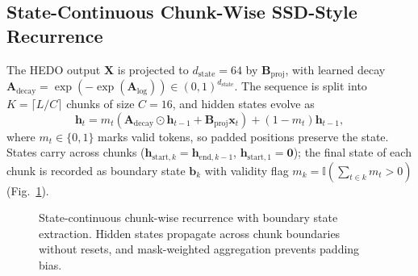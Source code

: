 \documentclass[pdflatex,sn-mathphys-num]{sn-jnl}
\begin{document}
\subsection{State-Continuous Chunk-Wise SSD-Style Recurrence}
The HEDO output $\mathbf{X}$ is projected to $d_{\text{state}} = 64$ by $\mathbf{B}_{\text{proj}}$, with learned decay $\mathbf{A}_{\text{decay}} = \exp(-\exp(\mathbf{A}_{\text{log}})) \in (0, 1)^{d_{\text{state}}}$. The sequence is split into $K = \lceil L / C \rceil$ chunks of size $C = 16$, and hidden states evolve as
\begin{equation}
\mathbf{h}_{t} = m_t \left( \mathbf{A}_{\text{decay}} \odot \mathbf{h}_{t-1} + \mathbf{B}_{\text{proj}} \mathbf{x}_t \right) + (1 - m_t) \mathbf{h}_{t-1},
\end{equation}
where $m_t \in \{0, 1\}$ marks valid tokens, so padded positions preserve the state. States carry across chunks ($\mathbf{h}_{\text{start}, k} = \mathbf{h}_{\text{end}, k-1}$, $\mathbf{h}_{\text{start}, 1} = \mathbf{0}$); the final state of each chunk is recorded as boundary state $\mathbf{b}_k$ with validity flag $m_k = \mathbb{I}(\sum_{t \in k} m_t > 0)$ (Fig.~\ref{fig:chunk_recurrence}).

\begin{figure}[!htbp]
\centering
\resizebox{0.9\textwidth}{!}{\HEDOChunkFigure}
\caption{State-continuous chunk-wise recurrence with boundary state extraction. Hidden states propagate across chunk boundaries without resets, and mask-weighted aggregation prevents padding bias.}
\label{fig:chunk_recurrence}
\end{figure}
\end{document}
